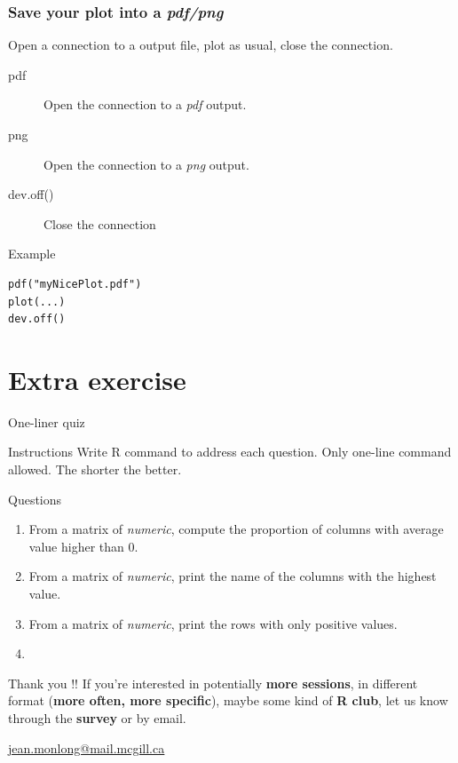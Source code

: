 \documentclass[10pt]{beamer}
\newenvironment{xframe}[2][]
  {\begin{frame}[fragile,environment=xframe,#1]
  \frametitle{#2}}
  {\end{frame}}
\begin{document}

\begin{xframe}{Save your plot into a {\it pdf/png}}
  \begin{block}{}
    Open a connection to a output file, plot as usual, close the connection.
    \begin{description}
    \item[pdf] Open the connection to a {\it pdf} output.
    \item[png] Open the connection to a {\it png} output.
    \item[dev.off()] Close the connection
    \end{description}
  \end{block}
  \begin{exampleblock}{Example}
\begin{verbatim}
pdf("myNicePlot.pdf")
plot(...)
dev.off()
\end{verbatim}  
  \end{exampleblock}
\end{xframe}

\section{Extra exercise}

\begin{frame}{One-liner quiz}
  \begin{block}{Instructions}
    Write R command to address each question. Only one-line command allowed. The shorter the better.
  \end{block}
  \begin{block}{Questions}
    \begin{enumerate}
    \item From a {\sf matrix} of {\it numeric}, compute the proportion of columns with average value higher than 0.
    \item From a {\sf matrix} of {\it numeric}, print the name of the columns with the highest value.
    \item From a {\sf matrix} of {\it numeric}, print the rows with only positive values.
    \item 
    \end{enumerate}
  \end{block}
\end{frame}



\begin{frame}{Thank you !!}
  \centering
  If you're interested in potentially {\bf more sessions}, in different format ({\bf more often, more specific}), maybe some kind of {\bf R club}, let us know through the {\bf survey} or by email.

  \bigskip
  \bigskip

  \uline{\href{mailto:jean.monlong@mail.mcgill.ca}{jean.monlong@mail.mcgill.ca}}
\end{frame}
\end{document}
